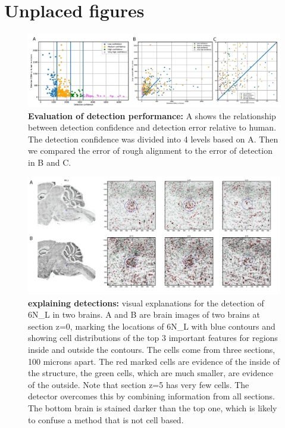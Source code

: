 \documentclass[runningheads]{llncs}
\begin{document}
 
 

\appendix
\section{Unplaced figures}

\begin{figure}[t]
  \includegraphics[width=\textwidth]{figures/DetectionPerformance.png}
  \caption{{\bf Evaluation of detection performance:}  A  shows the relationship between detection confidence and detection error relative to human. The detection confidence was divided  into  4 levels based on A. Then we compared the error of rough alignment to the error of detection in B and C.
}
\end{figure}

\begin{figure}[t]
  \includegraphics[width=\textwidth]{figures/DetectionExplanation.png}
  \caption{{\bf explaining detections:} visual explanations for the
    detection of 6N\_L in two brains. A and B are brain images of two
    brains at section z=0, marking the locations of 6N\_L with blue
    contours and showing cell distributions of the top 3 important
    features for regions inside and outside the contours.  The cells
    come from three sections, 100 microns apart. The red marked cells
    are evidence of the inside of the structure, the green cells,
    which are much smaller, are evidence of the outside. Note that
    section z=5 has very few cells. The detector overcomes this by
    combining information from all sections.  The bottom brain is
    stained darker than the top one, which is likely to confuse a
    method that is not cell based.}
  \end{figure}
\end{document}
